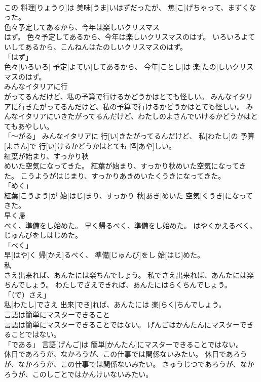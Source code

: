 \documentclass[8pt]{extreport}
\begin{document}
\begin{CJK}{UTF8}{min}
\\	この 料理[りょうり]は 美味[うま]いはずだったが、 焦[こ]げちゃって、まずくなった。		
\\	色々予定してあるから、今年は楽しいクリスマス
\\	はず。	色々予定してあるから、今年は楽しいクリスマスのはず。	いろいろよていしてあるから、こんねんはたのしいクリスマスのはず。	
\\	「はず」 
\\	色々[いろいろ] 予定[よてい]してあるから、 今年[ことし]は 楽[たの]しいクリスマスのはず。		
\\	みんなイタリアに行
\\	がってるんだけど、私の予算で行けるかどうかはとても怪しい。	みんなイタリアに行きたがってるんだけど、私の予算で行けるかどうかはとても怪しい。	みんなイタリアにいきたがってるんだけど、わたしのよさんでいけるかどうかはとてもあやしい。	
\\	「～がる」	みんなイタリアに 行[い]きたがってるんだけど、 私[わたし]の 予算[よさん]で 行[い]けるかどうかはとても 怪[あや]しい。		
\\	紅葉が始まり、すっかり秋
\\	めいた空気になってきた。	紅葉が始まり、すっかり秋めいた空気になってきた。	こうようがはじまり、すっかりあきめいたくうきになってきた。	
\\	「めく」 
\\	紅葉[こうよう]が 始[はじ]まり、すっかり 秋[あき]めいた 空気[くうき]になってきた。		
\\	早く帰
\\	べく、準備をし始めた。	早く帰るべく、準備をし始めた。	はやくかえるべく、じゅんびをしはじめた。	
\\	「べく」 
\\	早[はや]く 帰[かえ]るべく、 準備[じゅんび]をし 始[はじ]めた。		
\\	私
\\	さえ出来れば、あんたには楽ちんでしょう。	私でさえ出来れば、あんたには楽ちんでしょう。	わたしでさえできれば、あんたにはらくちんでしょう。	
\\	「（で）さえ」 
\\	私[わたし]でさえ 出来[でき]れば、あんたには 楽[らく]ちんでしょう。		
\\	言語は簡単にマスターできること
\\	言語は簡単にマスターできることではない。	げんごはかんたんにマスターできることではない。	
\\	「である」	言語[げんご]は 簡単[かんたん]にマスターできることではない。		
\\	休日であろうが、なかろうが、この仕事では関係ないみたい。	休日であろうが、なかろうが、この仕事では関係ないみたい。	きゅうじつであろうが、なかろうが、このしごとではかんけいないみたい。	

\end{CJK}
\end{document}
